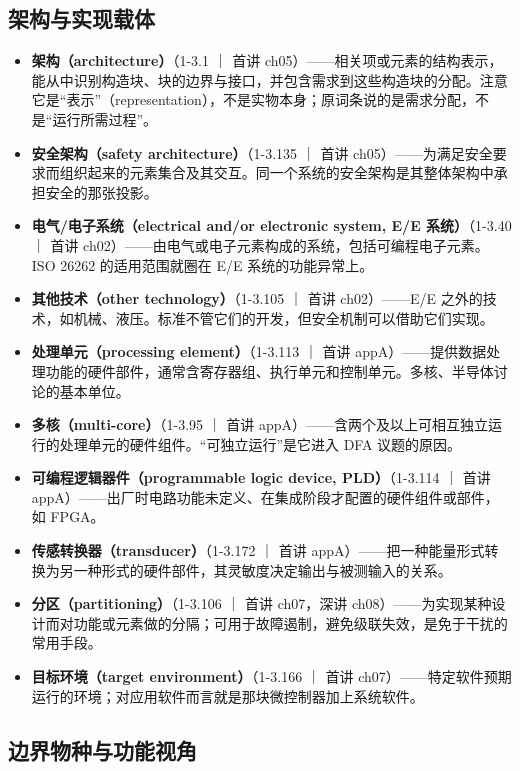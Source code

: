 \subsection{架构与实现载体}

\begin{itemize}
\item \textbf{架构（architecture）}（1-3.1 ｜ 首讲 ch05）——相关项或元素的结构表示，能从中识别构造块、块的边界与接口，并包含需求到这些构造块的分配。注意它是“表示”（representation），不是实物本身；原词条说的是需求分配，不是“运行所需过程”。
\item \textbf{安全架构（safety architecture）}（1-3.135 ｜ 首讲 ch05）——为满足安全要求而组织起来的元素集合及其交互。同一个系统的安全架构是其整体架构中承担安全的那张投影。
\item \textbf{电气/电子系统（electrical and/or electronic system, E/E 系统）}（1-3.40 ｜ 首讲 ch02）——由电气或电子元素构成的系统，包括可编程电子元素。ISO 26262 的适用范围就圈在 E/E 系统的功能异常上。
\item \textbf{其他技术（other technology）}（1-3.105 ｜ 首讲 ch02）——E/E 之外的技术，如机械、液压。标准不管它们的开发，但安全机制可以借助它们实现。
\item \textbf{处理单元（processing element）}（1-3.113 ｜ 首讲 appA）——提供数据处理功能的硬件部件，通常含寄存器组、执行单元和控制单元。多核、半导体讨论的基本单位。
\item \textbf{多核（multi-core）}（1-3.95 ｜ 首讲 appA）——含两个及以上可相互独立运行的处理单元的硬件组件。“可独立运行”是它进入 DFA 议题的原因。
\item \textbf{可编程逻辑器件（programmable logic device, PLD）}（1-3.114 ｜ 首讲 appA）——出厂时电路功能未定义、在集成阶段才配置的硬件组件或部件，如 FPGA。
\item \textbf{传感转换器（transducer）}（1-3.172 ｜ 首讲 appA）——把一种能量形式转换为另一种形式的硬件部件，其灵敏度决定输出与被测输入的关系。
\item \textbf{分区（partitioning）}（1-3.106 ｜ 首讲 ch07，深讲 ch08）——为实现某种设计而对功能或元素做的分隔；可用于故障遏制，避免级联失效，是免于干扰的常用手段。
\item \textbf{目标环境（target environment）}（1-3.166 ｜ 首讲 ch07）——特定软件预期运行的环境；对应用软件而言就是那块微控制器加上系统软件。
\end{itemize}

\subsection{边界物种与功能视角}

